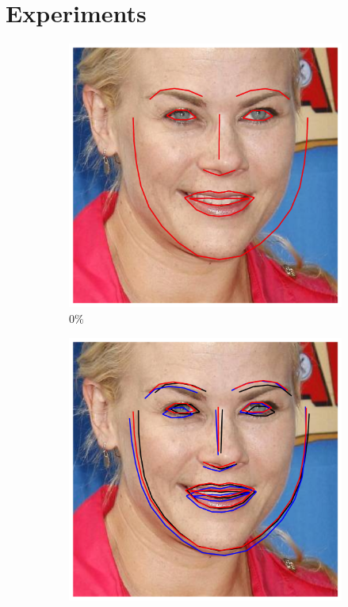 \section{Experiments}
\label{sec:experiment}

\begin{figure}[t!]
	\centering
	\begin{subfigure}{0.16\textwidth}
		\includegraphics[width=\textwidth]{figures/ini_0.png}
		\caption{$0\%$}
		\label{fig:ini_0}
	\end{subfigure}
	\begin{subfigure}{0.16\textwidth}
		\includegraphics[width=\textwidth]{figures/ini_1.png}

\end{subfigure}
\end{figure}
